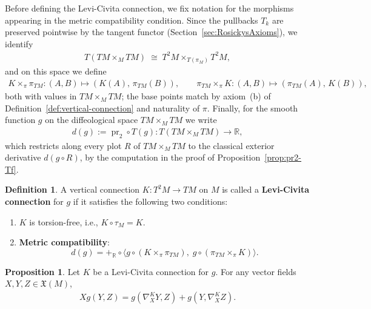 \documentclass{amsart}
\newcommand{\R}{\mathbb{R}}
\DeclareMathOperator{\pr}{pr}
\theoremstyle{definition}
\newtheorem{defn}[thm]{Definition}
\newtheorem{prop}[thm]{Proposition}
\begin{document}
Before defining the Levi-Civita connection, we fix notation for the
morphisms appearing in the metric compatibility condition. Since the
pullbacks $T_k$ are preserved pointwise by the tangent functor
(Section~\ref{sec:RosickysAxioms}), we identify
\begin{align*}
  T(TM \times_M TM) \;\cong\; T^2M \times_{T(\pi_M)} T^2M,
\end{align*}
and on this space we define
\begin{align*}
  K \times_{\pi} \pi_{TM} \colon (A, B) \longmapsto (K(A),\, \pi_{TM}(B)),
  \qquad
  \pi_{TM} \times_{\pi} K \colon (A, B) \longmapsto (\pi_{TM}(A),\, K(B)),
\end{align*}
both with values in $TM \times_M TM$; the base points match by axiom~(b)
of Definition~\ref{def:vertical-connection} and naturality of $\pi$.
Finally, for the smooth function $g$ on the diffeological space
$TM \times_M TM$ we write
\begin{align*}
  d(g) := \pr_2 \circ T(g) \colon T(TM \times_M TM) \to \R,
\end{align*}
which restricts along every plot $R$ of $TM \times_M TM$ to the classical
exterior derivative $d(g \circ R)$, by the computation in the proof of
Proposition~\ref{prop:pr2-Tf}.

\begin{defn}\label{def:levi-civita}
A vertical connection $K \colon T^2M \to TM$ on $M$ is called a
\textbf{Levi-Civita connection} for $g$ if it satisfies the following two
conditions:
\begin{enumerate}
    \item $K$ is torsion-free, i.e., $K \circ \tau_M = K$.
    \item \textbf{Metric compatibility}:
    \begin{equation}\label{eq:metric-compatibility}
        d(g) = +_{\R} \circ \langle g \circ (K \times_{\pi} \pi_{TM}),\;
               g \circ (\pi_{TM} \times_{\pi} K) \rangle.
    \end{equation}
\end{enumerate}
\end{defn}

\begin{prop}\label{prop:metric-compatibility-vf}
  Let $K$ be a Levi-Civita connection for $g$.
  For any vector fields $X, Y, Z \in \mathfrak{X}(M)$,
  \begin{align*}
    Xg(Y, Z) = g(\nabla^K_X Y, Z) + g(Y, \nabla^K_X Z).
  \end{align*}
\end{prop}
\end{document}
